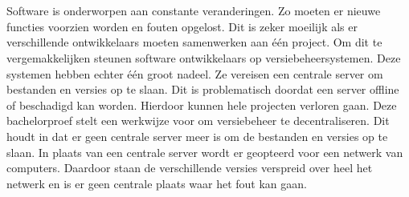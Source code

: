


%



\chapter*{}
%
%
Software is onderworpen aan constante veranderingen. Zo moeten er nieuwe functies voorzien worden en fouten opgelost. Dit is zeker moeilijk als er verschillende ontwikkelaars moeten samenwerken aan één project. Om dit te vergemakkelijken steunen software ontwikkelaars op versiebeheersystemen. Deze systemen hebben echter één groot nadeel. Ze vereisen een centrale server om bestanden en versies op te slaan.  Dit is problematisch doordat een server offline of beschadigd kan worden. Hierdoor kunnen hele projecten verloren gaan. Deze bachelorproef stelt een werkwijze voor om versiebeheer te decentraliseren. Dit houdt in dat er geen centrale server meer is om de bestanden en versies op te slaan. In plaats van een centrale server wordt er geopteerd voor een netwerk van computers. Daardoor staan de verschillende versies verspreid over heel het netwerk en is er geen centrale plaats waar het fout kan gaan.\\

